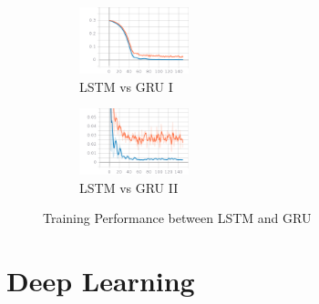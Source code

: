 \begin{figure}[h!]
	\centering
	\begin{subfigure}{.5\textwidth}
		\includegraphics[width=0.35\textwidth]{fig/trg.png}
		\caption{LSTM vs GRU I}
		\label{fig:trg}
	\end{subfigure}%
	\begin{subfigure}{.5\textwidth}
			\centering
		\includegraphics[width=0.35\textwidth]{fig/train.png}
		\caption{LSTM vs GRU II}
		\label{fig:train}
	\end{subfigure}	
	\caption{Training Performance between LSTM and GRU}
\end{figure}


\section{Deep Learning}

